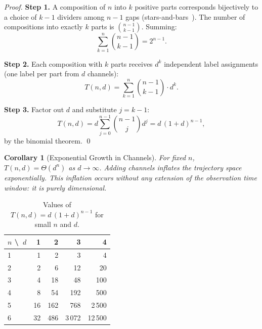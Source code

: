 \documentclass[11pt,twocolumn,a4paper]{article}
\newtheorem{corollary}[theorem]{Corollary}
\begin{document}
\begin{proof}
\textbf{Step 1.}  A composition of $n$ into $k$ positive parts
corresponds bijectively to a choice of $k-1$ dividers among $n-1$
gaps (stars-and-bars~\citep{andrews1976,graham1994}).  The number of
compositions into exactly $k$ parts is $\binom{n-1}{k-1}$.  Summing:
\begin{equation}
  \sum_{k=1}^{n} \binom{n-1}{k-1} = 2^{n-1}.
  \label{eq:total-comps}
\end{equation}

\textbf{Step 2.}  Each composition with $k$ parts receives $d^k$
independent label assignments (one label per part from $d$ channels):
\begin{equation}
  T(n,d) = \sum_{k=1}^{n} \binom{n-1}{k-1} \cdot d^k.
  \label{eq:tnd-sum}
\end{equation}

\textbf{Step 3.}  Factor out $d$ and substitute $j = k - 1$:
\begin{equation}
  T(n,d) = d \sum_{j=0}^{n-1} \binom{n-1}{j} d^j = d\,(1+d)^{n-1},
  \label{eq:tnd-binomial}
\end{equation}
by the binomial theorem.  \qed
\end{proof}

\begin{corollary}[Exponential Growth in Channels]
\label{cor:exp-growth}
For fixed $n$, $T(n,d) = \Theta(d^n)$ as $d \to \infty$.  Adding
channels inflates the trajectory space exponentially.  This inflation
occurs without any extension of the observation time window: it is
purely dimensional.
\end{corollary}

\begin{table}[h]
\centering
\caption{Values of $T(n,d) = d\,(1+d)^{n-1}$ for small $n$ and $d$.}
\label{tab:tnd}
\small
\begin{tabular}{@{}lrrrr@{}}
\toprule
$n$ \textbackslash\ $d$ & 1 & 2 & 3 & 4 \\
\midrule
1 &   1 &    2 &    3 &     4 \\
2 &   2 &    6 &   12 &    20 \\
3 &   4 &   18 &   48 &   100 \\
4 &   8 &   54 &  192 &   500 \\
5 &  16 &  162 &  768 & 2\,500 \\
6 &  32 &  486 & 3\,072 & 12\,500 \\
\bottomrule
\end{tabular}
\end{table}
\end{document}
